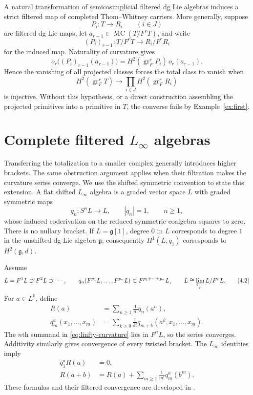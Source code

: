 \documentclass[11pt]{article}
\theoremstyle{definition}
\theoremstyle{remark}
\newcommand{\MC}{\operatorname{MC}}
\newcommand{\gr}{\operatorname{gr}}
\begin{document}
A natural transformation of semicosimplicial filtered dg Lie algebras
induces a strict filtered map of completed Thom--Whitney carriers.  More
generally, suppose
\[
 P_i:T\longrightarrow R_i\qquad(i\in J)
\]
are filtered dg Lie maps, let
$a_{r-1}\in\MC(T/F^rT)$, and write
\[
 (P_i)_{r-1}:T/F^rT\longrightarrow R_i/F^rR_i
\]
for the induced map.  Naturality of curvature gives
\[
 o_r\bigl((P_i)_{r-1}(a_{r-1})\bigr)=
 H^2(\gr_F^rP_i)\,o_r(a_{r-1}).
 \tag{3.9}\label{eq:row-obstruction}
\]
Hence the vanishing of all projected classes forces the total class to
vanish when
\[
 H^2(\gr_F^rT)\longrightarrow
 \prod_{i\in J}H^2(\gr_F^rR_i)
 \tag{3.10}\label{eq:joint-injectivity}
\]
is injective.  Without this hypothesis, or a direct construction assembling
the projected primitives into a primitive in $T$, the converse fails by
Example~\ref{ex:first}.

\section{Complete filtered \texorpdfstring{$L_\infty$}{L-infinity} algebras}

Transferring the totalization to a smaller complex generally introduces
higher brackets.  The same obstruction argument applies when their
filtration makes the curvature series converge.  We use the shifted
symmetric convention to state this extension.
A flat shifted $L_\infty$ algebra is a graded vector space $L$ with graded
symmetric maps
\[
 q_n:S^nL\longrightarrow L,
 \qquad |q_n|=1,
 \qquad n\geq1,
 \tag{4.1}\label{eq:shifted-brackets}
\]
whose induced coderivation on the reduced symmetric coalgebra squares to
zero.  There is no nullary bracket.  If $L=\mathfrak g[1]$, degree $0$ in
$L$ corresponds to degree $1$ in the unshifted dg Lie algebra
$\mathfrak g$; consequently $H^1(L,q_1)$ corresponds to
$H^2(\mathfrak g,d)$.

Assume
\[
 L=F^1L\supset F^2L\supset\cdots,
 \qquad
 q_n(F^{p_1}L,\ldots,F^{p_n}L)
 \subset F^{p_1+\cdots+p_n}L,
 \qquad
 L\cong\varprojlim_rL/F^rL.
 \tag{4.2}\label{eq:linfty-filtration}
\]
For $a\in L^0$, define
\begin{align}
 R(a)&=\sum_{n\geq1}\frac1{n!}q_n(a^n),
 \tag{4.3}\label{eq:linfty-curvature}\\
 q_m^a(x_1,\ldots,x_m)
 &=\sum_{k\geq0}\frac1{k!}
 q_{m+k}(a^k,x_1,\ldots,x_m).
 \tag{4.4}\label{eq:twist}
\end{align}
The $n$th summand in \eqref{eq:linfty-curvature} lies in $F^nL$, so the
series converges.  Additivity similarly gives convergence of every twisted
bracket.  The $L_\infty$ identities imply
\begin{align}
 q_1^aR(a)&=0,
 \tag{4.5}\label{eq:linfty-bianchi}\\
 R(a+b)&=R(a)+
 \sum_{m\geq1}\frac1{m!}q_m^a(b^m).
 \tag{4.6}\label{eq:linfty-translation}
\end{align}
These formulas and their filtered convergence are developed in
\cite{DolgushevRogers,RogersComplete}.
\end{document}
